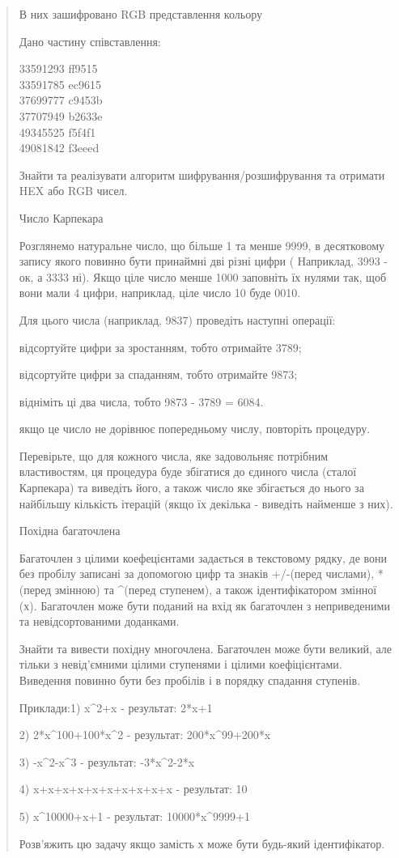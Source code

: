 \documentclass[]{article}
\begin{document}
\begin{quote}
В них зашифровано RGB представлення кольору

Дано частину співставлення:

33591293 ff9515\\
33591785 ec9615\\
37699777 c9453b\\
37707949 b2633e\\
49345525 f5f4f1\\
49081842 f3eeed

Знайти та реалізувати алгоритм шифрування/розшифрування та отримати HEX
або RGB чисел.

Число Карпекара

Розглянемо натуральне число, що більше 1 та менше 9999, в десятковому
запису якого повинно бути принаймні дві різні цифри ( Наприклад, 3993 -
ок, а 3333 ні). Якщо ціле число менше 1000 заповніть їх нулями так, щоб
вони мали 4 цифри, наприклад, ціле число 10 буде 0010.

Для цього числа (наприклад, 9837) проведіть наступні операції:

відсортуйте цифри за зростанням, тобто отримайте 3789;

відсортуйте цифри за спаданням, тобто отримайте 9873;

відніміть ці два числа, тобто 9873 - 3789 = 6084.

якщо це число не дорівнює попередньому числу, повторіть процедуру.

Перевірьте, що для кожного числа, яке задовольняє потрібним
властивостям, ця процедура буде збігатися до єдиного числа (сталої
Карпекара) та виведіть його, а також число яке збігається до нього за
найбільшу кількість ітерацій (якщо їх декілька - виведіть найменше з
них).

Похідна багаточлена

Багаточлен з цілими коефецієнтами задається в текстовому рядку, де вони
без пробілу записані за допомогою цифр та знаків +/-(перед числами),
*(перед змінною) та \^{}(перед ступенем), а також ідентифікатором
змінної (х). Багаточлен може бути поданий на вхід як багаточлен з
неприведеними та невідсортованими доданками.

Знайти та вивести похідну многочлена. Багаточлен може бути великий, але
тільки з невід'ємними цілими ступенями і цілими коефіцієнтами. Виведення
повинно бути без пробілів і в порядку спадання ступенів.

Приклади:1) x\^{}2+x - результат: 2*x+1

2) 2*x\^{}100+100*x\^{}2 - результат: 200*x\^{}99+200*x

3) -x\^{}2-x\^{}3 - результат: -3*x\^{}2-2*x

4) x+x+x+x+x+x+x+x+x+x - результат: 10

5) x\^{}10000+x+1 - результат: 10000*x\^{}9999+1

Розв'яжить цю задачу якщо замість х може бути будь-який ідентифікатор.
\end{quote}
\end{document}
